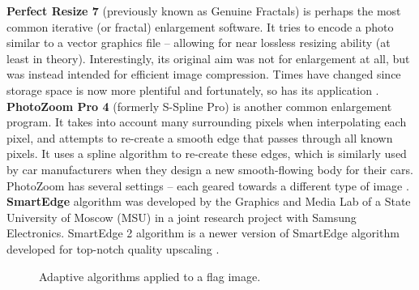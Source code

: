 \documentclass[]{usiinfbachelorproject}
\begin{document}
{\bf Perfect Resize 7} (previously known as Genuine Fractals) is perhaps the most common iterative (or fractal) enlargement software. It tries to encode a photo similar to a vector graphics file -- allowing for near lossless resizing ability (at least in theory). Interestingly, its original aim was not for enlargement at all, but was instead intended for efficient image compression. Times have changed since storage space is now more plentiful and fortunately, so has its application \cite{Perfect2012}.\\

{\bf PhotoZoom Pro 4} (formerly S-Spline Pro) is another common enlargement program. It takes into account many surrounding pixels when interpolating each pixel, and attempts to re-create a smooth edge that passes through all known pixels. It uses a spline algorithm to re-create these edges, which is similarly used by car manufacturers when they design a new smooth-flowing body for their cars. PhotoZoom has several settings -- each geared towards a different type of image \cite{Benvista2012}.\\

{\bf SmartEdge} algorithm was developed by the Graphics and Media Lab of a State University of Moscow (MSU) in a joint research project with Samsung Electronics. SmartEdge 2 algorithm is a newer version of SmartEdge algorithm developed for top-notch quality upscaling \cite{Smartedge2007}.

\begin{figure}[ht]
	\centering
	\caption{Adaptive algorithms applied to a flag image.}
	\label{fig:adaptive}
\end{figure}
\end{document}
